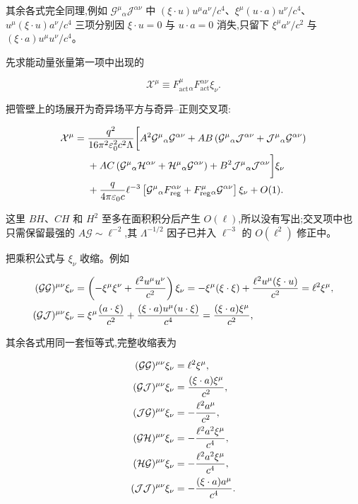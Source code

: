 其余各式完全同理,例如 $\mathcal G^\mu{}_\alpha\mathcal J^{\alpha\nu}$ 中 $(\xi\cdot u)u^\mu a^\nu/c^4$、$\xi^\mu(u\cdot a)u^\nu/c^4$、$u^\mu(\xi\cdot u)a^\nu/c^4$ 三项分别因 $\xi\cdot u=0$ 与 $u\cdot a=0$ 消失,只留下 $\xi^\mu a^\nu/c^2$ 与 $(\xi\cdot a)u^\mu u^\nu/c^4$。

先求能动量张量第一项中出现的

\begin{equation*}
 \mathcal X^\mu
 \equiv F_{\mathrm{act}}^\mu{}_\alpha
 F_{\mathrm{act}}^{\alpha\nu}\xi_\nu.
\end{equation*}

把管壁上的场展开为奇异场平方与奇异--正则交叉项:

\begin{align*}
 \mathcal X^\mu
 ={}&{q^2\over16\pi^2\varepsilon_0^2c^2\Lambda}
 \bigg[
 A^2\mathcal G^\mu{}_\alpha\mathcal G^{\alpha\nu}
 +AB\left(
 \mathcal G^\mu{}_\alpha\mathcal J^{\alpha\nu}
 +\mathcal J^\mu{}_\alpha\mathcal G^{\alpha\nu}
 \right)\\
 &+AC\left(
 \mathcal G^\mu{}_\alpha\mathcal H^{\alpha\nu}
 +\mathcal H^\mu{}_\alpha\mathcal G^{\alpha\nu}
 \right)
 +B^2\mathcal J^\mu{}_\alpha\mathcal J^{\alpha\nu}
 \bigg]\xi_\nu\\
 &+{q\over4\pi\varepsilon_0c}\ell^{-3}
 \left[
 \mathcal G^\mu{}_\alpha F_{\mathrm{reg}}^{\alpha\nu}
 +F_{\mathrm{reg}}^\mu{}_\alpha\mathcal G^{\alpha\nu}
 \right]\xi_\nu
 +O(1).
\end{align*}

这里 $BH$、$CH$ 和 $H^2$ 至多在面积积分后产生 $O(\ell)$,所以没有写出;交叉项中也只需保留最强的 $A\mathcal G\sim\ell^{-2}$,其 $\Lambda^{-1/2}$ 因子已并入 $\ell^{-3}$ 的 $O(\ell^2)$ 修正中。

把乘积公式与 $\xi_\nu$ 收缩。例如

\begin{align*}
 (\mathcal G\mathcal G)^{\mu\nu}\xi_\nu
 &=\left(-\xi^\mu\xi^\nu+{\ell^2u^\mu u^\nu\over c^2}\right)\xi_\nu
 =-\xi^\mu(\xi\cdot\xi)+{\ell^2u^\mu(\xi\cdot u)\over c^2}
 =\ell^2\xi^\mu,\\
 (\mathcal G\mathcal J)^{\mu\nu}\xi_\nu
 &=\xi^\mu{(a\cdot\xi)\over c^2}+{(\xi\cdot a)u^\mu(u\cdot\xi)\over c^4}
 ={(\xi\cdot a)\xi^\mu\over c^2},
\end{align*}

其余各式用同一套恒等式,完整收缩表为

\begin{align*}
 (\mathcal G\mathcal G)^{\mu\nu}\xi_\nu
 &=\ell^2\xi^\mu,\\
 (\mathcal G\mathcal J)^{\mu\nu}\xi_\nu
 &={(\xi\cdot a)\xi^\mu\over c^2},\\
 (\mathcal J\mathcal G)^{\mu\nu}\xi_\nu
 &=-{\ell^2a^\mu\over c^2},\\
 (\mathcal G\mathcal H)^{\mu\nu}\xi_\nu
 &=-{\ell^2a^2\xi^\mu\over c^4},\\
 (\mathcal H\mathcal G)^{\mu\nu}\xi_\nu
 &=-{\ell^2a^2\xi^\mu\over c^4},\\
 (\mathcal J\mathcal J)^{\mu\nu}\xi_\nu
 &=-{(\xi\cdot a)a^\mu\over c^4}.
\end{align*}


